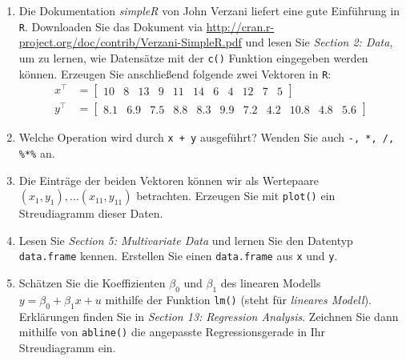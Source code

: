 
\begin{enumerate}

\item Die Dokumentation \emph{simpleR} von John Verzani liefert eine gute Einführung in \texttt{R}. Downloaden Sie das Dokument via \href{http://cran.r-project.org/doc/contrib/Verzani-SimpleR.pdf}{http://cran.r-project.org/doc/contrib/Verzani-SimpleR.pdf} und lesen Sie \emph{Section 2: Data}, um zu lernen, wie Datensätze mit der \texttt{c()} Funktion eingegeben werden können. Erzeugen Sie anschließend folgende zwei Vektoren in \texttt{R}:
\setcounter{MaxMatrixCols}{11}
\begin{align*}
x^\top &=
\begin{bmatrix}
10 & 8 & 13 & 9 & 11 & 14 & 6 & 4 & 12 & 7 & 5
\end{bmatrix}
\\
y^\top &=
\begin{bmatrix}
8.1 & 6.9 & 7.5 & 8.8 & 8.3 & 9.9 & 7.2 & 4.2 & 10.8 & 4.8 & 5.6
\end{bmatrix}
\end{align*}


\item Welche Operation wird durch \texttt{x + y} ausgeführt? Wenden Sie auch \texttt{-, *, /, \%*\%} an.


\item Die Einträge der beiden Vektoren können wir als Wertepaare $(x_1,y_1), \ldots (x_{11}, y_{11})$ betrachten. Erzeugen Sie mit \texttt{plot()} ein Streudiagramm dieser Daten.


\item Lesen Sie \emph{Section 5: Multivariate Data} und lernen Sie den Datentyp \texttt{data.frame} kennen. Erstellen Sie einen \texttt{data.frame} aus \texttt{x} und \texttt{y}.


\item Schätzen Sie die Koeffizienten $\beta_0$ und $\beta_1$ des linearen Modells $y = \beta_0 + \beta_1 x + u$ mithilfe der Funktion \texttt{lm()} (steht für \emph{lineares Modell}). Erklärungen finden Sie in \emph{Section 13: Regression Analysis}. Zeichnen Sie dann mithilfe von \texttt{abline()} die angepasste Regressionsgerade in Ihr Streudiagramm ein.


\end{enumerate}

